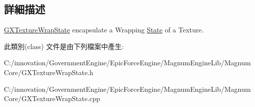 \subsection{詳細描述}
\hyperlink{class_i_dream_sky_1_1_g_x_texture_wrap_state}{G\+X\+Texture\+Wrap\+State} encapsulate a Wrapping \hyperlink{class_i_dream_sky_1_1_state}{State} of a Texture. 

此類別(class) 文件是由下列檔案中產生\+:\begin{DoxyCompactItemize}
\item 
C\+:/innovation/\+Government\+Engine/\+Epic\+Force\+Engine/\+Magnum\+Engine\+Lib/\+Magnum\+Core/G\+X\+Texture\+Wrap\+State.\+h\item 
C\+:/innovation/\+Government\+Engine/\+Epic\+Force\+Engine/\+Magnum\+Engine\+Lib/\+Magnum\+Core/G\+X\+Texture\+Wrap\+State.\+cpp\end{DoxyCompactItemize}
